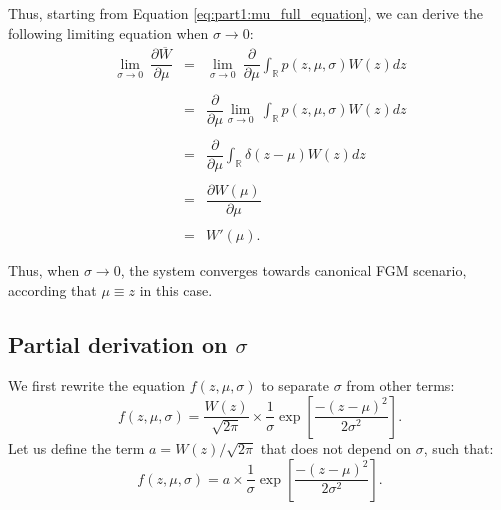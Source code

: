Thus, starting from Equation \ref{eq:part1:mu_full_equation}, we can derive the following limiting equation when $\sigma \rightarrow 0$:
\begin{equation}
\begin{array}{rcl}
\lim\limits_{\sigma \to 0}\ \dfrac{\partial \overline{W}}{\partial \mu} & = & \lim\limits_{\sigma \to 0}\ \dfrac{\partial}{\partial \mu} \displaystyle\int_{\mathbb{R}} p(z,\mu,\sigma)W(z)dz\\\\
& = & \dfrac{\partial}{\partial \mu} \lim\limits_{\sigma \to 0}\ \displaystyle\int_{\mathbb{R}} p(z,\mu,\sigma)W(z)dz\\\\
& = & \dfrac{\partial}{\partial \mu} \displaystyle\int_{\mathbb{R}} \delta(z-\mu)W(z)dz\\\\
& = & \dfrac{\partial W(\mu)}{\partial \mu}\\\\
& = & W'(\mu).
\end{array}
\label{eq:part1:sigma_zero_limit}
\end{equation}

Thus, when $\sigma \rightarrow 0$, the system converges towards canonical FGM scenario, according that $\mu \equiv z$ in this case.


\subsection*{Partial derivation on $\sigma$}

We first rewrite the equation $f(z,\mu,\sigma)$ to separate $\sigma$ from other terms:
\begin{equation}
f(z,\mu,\sigma) = \dfrac{W(z)}{\sqrt{2\pi}} \times \dfrac{1}{\sigma} \exp \left[\dfrac{-(z-\mu)^2}{2\sigma^2}\right].
\end{equation}
Let us define the term $a = W(z)/\sqrt{2\pi}$ that does not depend on $\sigma$, such that:
\begin{equation}
f(z,\mu,\sigma) = a \times \dfrac{1}{\sigma} \exp \left[\dfrac{-(z-\mu)^2}{2\sigma^2}\right].
\end{equation}


